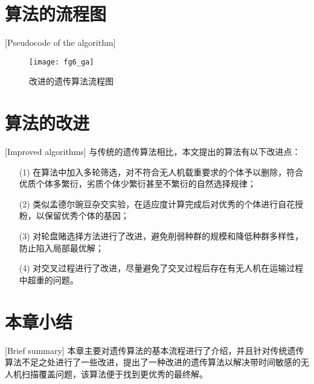 \section{算法的流程图}[Pseudocode of the algorithm]
\begin{figure}[H]
	\centering
	\texttt{[image: fg6\_ga]}
	\caption{改进的遗传算法流程图}
	\label{fg403}
\end{figure}


\section{算法的改进}[Improved algorithms]
与传统的遗传算法相比，本文提出的算法有以下改进点：
\begin{itemize}
	\item [(1)] 在算法中加入多轮筛选，对不符合无人机载重要求的个体予以删除，符合优质个体多繁衍，劣质个体少繁衍甚至不繁衍的自然选择规律；
	\item [(2)] 类似孟德尔豌豆杂交实验，在适应度计算完成后对优秀的个体进行自花授粉，以保留优秀个体的基因；
	\item [(3)] 对轮盘赌选择方法进行了改进，避免削弱种群的规模和降低种群多样性，防止陷入局部最优解；
 	\item [(4)] 对交叉过程进行了改进，尽量避免了交叉过程后存在有无人机在运输过程中超重的问题。
\end{itemize}
\section{本章小结}[Brief summary]
本章主要对遗传算法的基本流程进行了介绍，并且针对传统遗传算法不足之处进行了一些改进，提出了一种改进的遗传算法以解决带时间敏感的无人机扫描覆盖问题，该算法便于找到更优秀的最终解。